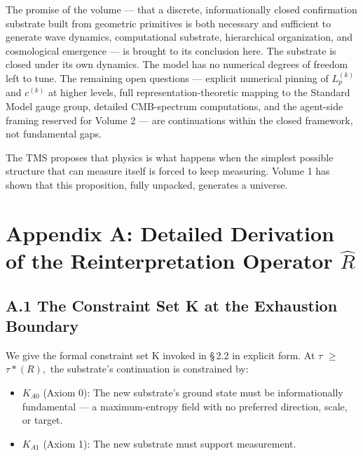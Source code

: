 \documentclass[11pt,oneside]{report}
\theoremstyle{definition}
\theoremstyle{remark}
\begin{document}
The promise of the volume --- that a discrete, informationally closed
confirmation substrate built from geometric primitives is both necessary
and sufficient to generate wave dynamics, computational substrate,
hierarchical organization, and cosmological emergence --- is brought to
its conclusion here. The substrate is closed under its own dynamics. The
model has no numerical degrees of freedom left to tune. The remaining
open questions --- explicit numerical pinning of \ensuremath{L_{p}^{(k)}} and
\ensuremath{c^{(k)}} at higher levels, full representation-theoretic mapping to the
Standard Model gauge group, detailed CMB-spectrum computations, and the
agent-side framing reserved for Volume 2 --- are continuations within
the closed framework, not fundamental gaps.

The TMS proposes that physics is what happens when the simplest possible
structure that can measure itself is forced to keep measuring. Volume 1
has shown that this proposition, fully unpacked, generates a universe.

\section*{Appendix A: Detailed Derivation of the Reinterpretation Operator \ensuremath{\hat{R}}}

\subsection*{A.1 The Constraint Set K at the Exhaustion Boundary}

We give the formal constraint set K invoked in \S\,2.2 in explicit form. At
\ensuremath{\tau} \ensuremath{\geq} \ensuremath{\tau *(R),} the substrate's continuation is constrained by:

\begin{itemize}
\item
  \ensuremath{K_{A0}} (Axiom 0): The new substrate's ground state must be
  informationally fundamental --- a maximum-entropy field with no
  preferred direction, scale, or target.
\end{itemize}

\begin{itemize}
\item
  \ensuremath{K_{A1}} (Axiom 1): The new substrate must support measurement.
\end{itemize}
\end{document}
